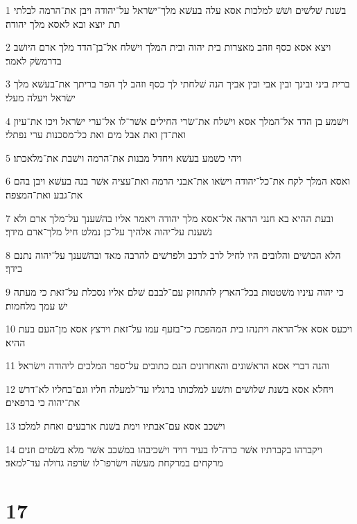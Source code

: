 \par 1 בשׁנת שׁלשׁים ושׁשׁ למלכות אסא עלה בעשׁא מלך־ישׂראל על־יהודה ויבן את־הרמה לבלתי תת יוצא ובא לאסא מלך יהודה׃
\par 2 ויצא אסא כסף וזהב מאצרות בית יהוה ובית המלך וישׁלח אל־בן־הדד מלך ארם היושׁב בדרמשׂק לאמר׃
\par 3 ברית ביני ובינך ובין אבי ובין אביך הנה שׁלחתי לך כסף וזהב לך הפר בריתך את־בעשׁא מלך ישׂראל ויעלה מעלי׃
\par 4 וישׁמע בן הדד אל־המלך אסא וישׁלח את־שׂרי החילים אשׁר־לו אל־ערי ישׂראל ויכו את־עיון ואת־דן ואת אבל מים ואת כל־מסכנות ערי נפתלי׃
\par 5 ויהי כשׁמע בעשׁא ויחדל מבנות את־הרמה וישׁבת את־מלאכתו׃
\par 6 ואסא המלך לקח את־כל־יהודה וישׂאו את־אבני הרמה ואת־עציה אשׁר בנה בעשׁא ויבן בהם את־גבע ואת־המצפה׃
\par 7 ובעת ההיא בא חנני הראה אל־אסא מלך יהודה ויאמר אליו בהשׁענך על־מלך ארם ולא נשׁענת על־יהוה אלהיך על־כן נמלט חיל מלך־ארם מידך׃
\par 8 הלא הכושׁים והלובים היו לחיל לרב לרכב ולפרשׁים להרבה מאד ובהשׁענך על־יהוה נתנם בידך׃
\par 9 כי יהוה עיניו משׁטטות בכל־הארץ להתחזק עם־לבבם שׁלם אליו נסכלת על־זאת כי מעתה ישׁ עמך מלחמות׃
\par 10 ויכעס אסא אל־הראה ויתנהו בית המהפכת כי־בזעף עמו על־זאת וירצץ אסא מן־העם בעת ההיא׃
\par 11 והנה דברי אסא הראשׁונים והאחרונים הנם כתובים על־ספר המלכים ליהודה וישׂראל׃
\par 12 ויחלא אסא בשׁנת שׁלושׁים ותשׁע למלכותו ברגליו עד־למעלה חליו וגם־בחליו לא־דרשׁ את־יהוה כי ברפאים׃
\par 13 וישׁכב אסא עם־אבתיו וימת בשׁנת ארבעים ואחת למלכו׃
\par 14 ויקברהו בקברתיו אשׁר כרה־לו בעיר דויד וישׁכיבהו במשׁכב אשׁר מלא בשׂמים וזנים מרקחים במרקחת מעשׂה וישׂרפו־לו שׂרפה גדולה עד־למאד׃

\chapter{17}

